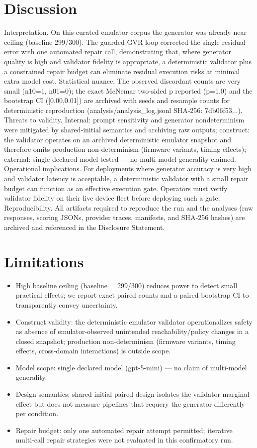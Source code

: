 \documentclass[conference]{IEEEtran}
\begin{document}
\section{Discussion}
Interpretation. On this curated emulator corpus the generator was already near ceiling (baseline 299/300). The guarded GVR loop corrected the single residual error with one automated repair call, demonstrating that, where generator quality is high and validator fidelity is appropriate, a deterministic validator plus a constrained repair budget can eliminate residual execution risks at minimal extra model cost. Statistical nuance. The observed discordant counts are very small (n10=1, n01=0); the exact McNemar two‑sided p reported (p=1.0) and the bootstrap CI ([0.00,0.01]) are archived with seeds and resample counts for deterministic reproduction (analysis/analysis\_log.jsonl SHA‑256: 7db06f53...). Threats to validity. Internal: prompt sensitivity and generator nondeterminism were mitigated by shared‑initial semantics and archiving raw outputs; construct: the validator operates on an archived deterministic emulator snapshot and therefore omits production non‑determinism (firmware variants, timing effects); external: single declared model tested --- no multi‑model generality claimed. Operational implications. For deployments where generator accuracy is very high and validator latency is acceptable, a deterministic validator with a small repair budget can function as an effective execution gate. Operators must verify validator fidelity on their live device fleet before deploying such a gate. Reproducibility. All artifacts required to reproduce the run and the analyses (raw responses, scoring JSONs, provider traces, manifests, and SHA‑256 hashes) are archived and referenced in the Disclosure Statement.

\section{Limitations}
\begin{itemize}
\item High baseline ceiling (baseline = 299/300) reduces power to detect small practical effects; we report exact paired counts and a paired bootstrap CI to transparently convey uncertainty.
\item Construct validity: the deterministic emulator validator operationalizes safety as absence of emulator‑observed unintended reachability/policy changes in a closed snapshot; production non‑determinism (firmware variants, timing effects, cross‑domain interactions) is outside scope.
\item Model scope: single declared model (gpt‑5‑mini) --- no claim of multi‑model generality.
\item Design semantics: shared‑initial paired design isolates the validator marginal effect but does not measure pipelines that requery the generator differently per condition.
\item Repair budget: only one automated repair attempt permitted; iterative multi‑call repair strategies were not evaluated in this confirmatory run.
\end{itemize}
\end{document}

